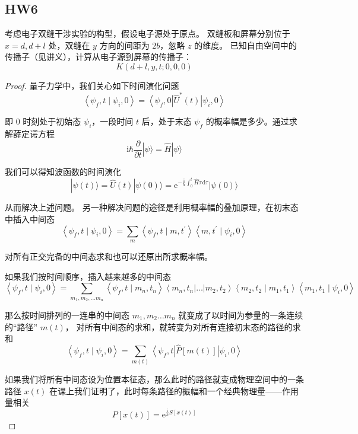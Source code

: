 \subsection{HW6}
\begin{1}
    考虑电子双缝干涉实验的构型，假设电子源处于原点。
    双缝板和屏幕分别位于 $x=d, d+l$ 处，双缝在 $y$ 方向的间距为 $2b$，忽略 $z$ 的维度。
    已知自由空间中的传播子（见讲义），计算从电子源到屏幕的传播子：
$$K(d+l, y, t ; 0,0,0)$$
\end{1}
\begin{proof}
量子力学中，我们关心如下时间演化问题
$$\left\langle\psi_{f}, t \mid \psi_{i}, 0\right\rangle
=\left\langle\psi_{f}, 0\right| \hat{U}^{*}(t)\left|\psi_{i}, 0\right\rangle$$

即 $0$ 时刻处于初始态 $\psi_{i}$，一段时间 $t$ 后，处于末态 $\psi_{f}$ 的概率幅是多少。通过求解薛定谔方程
$$\mathrm{i} \hbar \frac{\partial}{\partial t}|\psi\rangle=\hat{H}|\psi\rangle$$

我们可以得知波函数的时间演化
$$|\psi(t)\rangle=\hat{U}(t)|\psi(0)\rangle
=\mathrm{e}^{-\frac{\mathrm{i}}{\hbar} \int_{0}^{t} \hat{H} \tau \, \mathrm{d} \tau}|\psi(0)\rangle$$

从而解决上述问题。
另一种解决问题的途径是利用概率幅的叠加原理，在初末态中插入中间态
$$\left\langle\psi_{f}, t \mid \psi_{i}, 0\right\rangle
=\sum_{m}\left\langle\psi_{f}, t \mid m, t^{\prime}\right\rangle
\left\langle m, t^{\prime} \mid \psi_{i}, 0\right\rangle$$

对所有正交完备的中间态求和也可以还原出所求概率幅。

如果我们按时间顺序，插入越来越多的中间态
$$\left\langle\psi_{f}, t \mid \psi_{i}, 0\right\rangle
=\sum_{m_{1}, m_{2}, \ldots m_{n}}\left\langle\psi_{f}, t \mid m_{n}, t_{n}\right\rangle\left\langle m_{n}, t_{n}\right| \ldots\left|m_{2}, t_{2}\right\rangle\left\langle m_{2}, t_{2} \mid m_{1}, t_{1}\right\rangle\left\langle m_{1}, t_{1} \mid \psi_{i}, 0\right\rangle$$

那么按时间排列的一连串的中间态 $m_{1}, m_{2} \ldots m_{n}$ 就变成了以时间为参量的一条连续的``路径'' $m(t)$，
对所有中间态的求和，就转变为对所有连接初末态的路径的求和
$$\left\langle\psi_{f}, t \mid \psi_{i}, 0\right\rangle
=\sum_{m(t)}\left\langle\psi_{f}, t\right| \hat{P}[m(t)]\left|\psi_{i}, 0\right\rangle$$

如果我们将所有中间态设为位置本征态，那么此时的路径就变成物理空间中的一条路径 $x(t)$
在课上我们证明了，此时每条路径的振幅和一个经典物理量——作用量相关
$$P[x(t)]=\mathrm{e}^{\frac{\mathrm{i}}{h} S[x(t)]}$$


\end{proof}
